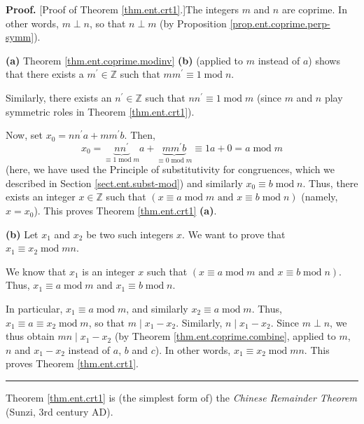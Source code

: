 \documentclass[numbers=enddot,12pt,final,onecolumn,notitlepage]{scrartcl}%
\numberwithin{exer}{subsection}
\theoremstyle{definition}
\newenvironment{proof}[1][Proof]{\noindent\textbf{#1.} }{\ \rule{0.5em}{0.5em}}
\newenvironment{noncompile}{}{}
\begin{document}
\begin{proof}
[Proof of Theorem \ref{thm.ent.crt1}.]The integers $m$ and $n$ are coprime. In
other words, $m\perp n$, so that $n\perp m$ (by Proposition
\ref{prop.ent.coprime.perp-symm}).

\textbf{(a)} Theorem \ref{thm.ent.coprime.modinv} \textbf{(b)} (applied to $m$
instead of $a$) shows that there exists a $m^{\prime}\in\mathbb{Z}$ such that
$mm^{\prime}\equiv1\operatorname{mod}n$.

Similarly, there exists an $n^{\prime}\in\mathbb{Z}$ such that $nn^{\prime
}\equiv1\operatorname{mod}m$ (since $m$ and $n$ play symmetric roles in
Theorem \ref{thm.ent.crt1}).

Now, set $x_{0}=nn^{\prime}a+mm^{\prime}b$. Then,%
\[
x_{0}=\underbrace{nn^{\prime}}_{\equiv1\operatorname{mod}m}%
a+\underbrace{mm^{\prime}b}_{\equiv0\operatorname{mod}m}\equiv
1a+0=a\operatorname{mod}m
\]
(here, we have used the Principle of substitutivity for congruences, which we
described in Section \ref{sect.ent.subst-mod}) and similarly $x_{0}\equiv
b\operatorname{mod}n$. Thus, there exists an integer $x\in\mathbb{Z}$ such
that $\left(  x\equiv a\operatorname{mod}m\text{ and }x\equiv
b\operatorname{mod}n\right)  $ (namely, $x=x_{0}$). This proves Theorem
\ref{thm.ent.crt1} \textbf{(a)}.

\textbf{(b)} Let $x_{1}$ and $x_{2}$ be two such integers $x$. We want to
prove that $x_{1}\equiv x_{2}\operatorname{mod}mn$.

We know that $x_{1}$ is an integer $x$ such that $\left(  x\equiv
a\operatorname{mod}m\text{ and }x\equiv b\operatorname{mod}n\right)  $. Thus,
$x_{1}\equiv a\operatorname{mod}m$ and $x_{1}\equiv b\operatorname{mod}n$.

In particular, $x_{1}\equiv a\operatorname{mod}m$, and similarly $x_{2}\equiv
a\operatorname{mod}m$. Thus, $x_{1}\equiv a\equiv x_{2}\operatorname{mod}m$,
so that $m\mid x_{1}-x_{2}$. Similarly, $n\mid x_{1}-x_{2}$. Since $m\perp n$,
we thus obtain $mn\mid x_{1}-x_{2}$ (by Theorem \ref{thm.ent.coprime.combine},
applied to $m$, $n$ and $x_{1}-x_{2}$ instead of $a$, $b$ and $c$). In other
words, $x_{1}\equiv x_{2}\operatorname{mod}mn$. This proves Theorem
\ref{thm.ent.crt1}.
\end{proof}

\begin{noncompile}
Theorem \ref{thm.ent.crt1} is (the simplest form of) the \textit{Chinese
Remainder Theorem} (Sunzi, 3rd century AD).
\end{noncompile}
\end{document}
